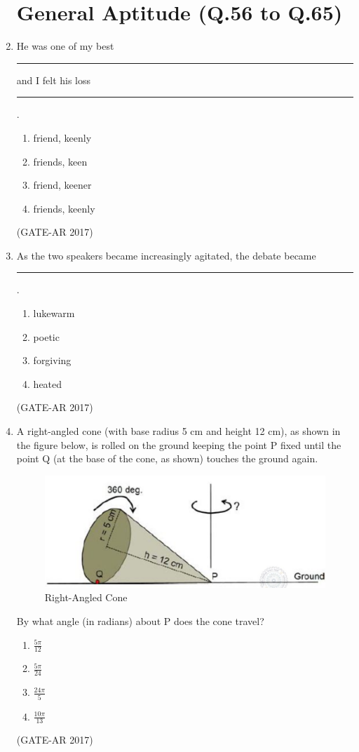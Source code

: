 \documentclass[a4paper,10pt]{article}
\begin{document}
\begin{enumerate}
\section*{General Aptitude (Q.56 to Q.65)}

    \item He was one of my best \rule{2cm}{0.4pt} and I felt his loss \rule{2cm}{0.4pt}.
    \begin{multicols}{4}
	\begin{enumerate}
        \item friend, keenly
        \item friends, keen
        \item friend, keener
        \item friends, keenly
    \end{enumerate}
	\end{multicols}
    \hfill (GATE-AR 2017)

    \item As the two speakers became increasingly agitated, the debate became \rule{2cm}{0.4pt}.
    \begin{multicols}{4}
	\begin{enumerate}
        \item lukewarm
        \item poetic
        \item forgiving
        \item heated
    \end{enumerate}
	\end{multicols}
    \hfill (GATE-AR 2017)

    \item A right-angled cone (with base radius 5 cm and height 12 cm), as shown in the figure below, is rolled on the ground keeping the point P fixed until the point Q (at the base of the cone, as shown) touches the ground again. \\
    \begin{figure}[h!]
        \centering
        \includegraphics[width=0.5\columnwidth]{figs/03.jpg}
        \caption{Right-Angled Cone}
	\label{fig:Img03}
	\end{figure}
    By what angle (in radians) about P does the cone travel?
    \begin{multicols}{2}
	\begin{enumerate}
        \item $\frac{5\pi}{12}$
        \item $\frac{5\pi}{24}$
        \item $\frac{24\pi}{5}$
        \item $\frac{10\pi}{13}$
    \end{enumerate}
	\end{multicols}
    \hfill (GATE-AR 2017)


\end{enumerate}
\end{document}
